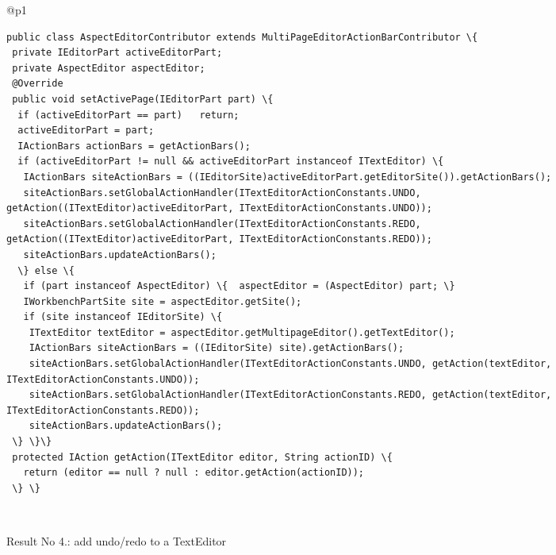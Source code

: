 \begin{figure*}[!htb]
 \begin{minipage}{1\textwidth}
\scriptsize 
\begin{tabular}{@{}p{}} 
 \hline 
   \\ \hline
  \vspace{-4mm}
\begin{Verbatim}[commandchars=\\\{\}, tabsize=2]
public class AspectEditorContributor extends MultiPageEditorActionBarContributor \{
 private IEditorPart activeEditorPart;
 private AspectEditor aspectEditor;
 @Override
 public void setActivePage(IEditorPart part) \{
  if (activeEditorPart == part)   return;
  activeEditorPart = part;
  IActionBars actionBars = getActionBars();
  if (activeEditorPart != null && activeEditorPart instanceof ITextEditor) \{
   IActionBars siteActionBars = ((IEditorSite)activeEditorPart.getEditorSite()).getActionBars();
   siteActionBars.setGlobalActionHandler(ITextEditorActionConstants.UNDO, getAction((ITextEditor)activeEditorPart, ITextEditorActionConstants.UNDO));
   siteActionBars.setGlobalActionHandler(ITextEditorActionConstants.REDO, getAction((ITextEditor)activeEditorPart, ITextEditorActionConstants.REDO));
   siteActionBars.updateActionBars();              
  \} else \{
   if (part instanceof AspectEditor) \{  aspectEditor = (AspectEditor) part; \}
   IWorkbenchPartSite site = aspectEditor.getSite();
   if (site instanceof IEditorSite) \{
    ITextEditor textEditor = aspectEditor.getMultipageEditor().getTextEditor();
    IActionBars siteActionBars = ((IEditorSite) site).getActionBars();
    siteActionBars.setGlobalActionHandler(ITextEditorActionConstants.UNDO, getAction(textEditor, ITextEditorActionConstants.UNDO));
    siteActionBars.setGlobalActionHandler(ITextEditorActionConstants.REDO, getAction(textEditor, ITextEditorActionConstants.REDO));
    siteActionBars.updateActionBars();              
 \} \}\}
 protected IAction getAction(ITextEditor editor, String actionID) \{
   return (editor == null ? null : editor.getAction(actionID));
 \} \}
   \end{Verbatim}
      \vspace{-4mm}
     \\ \hline
\end{tabular} 
\caption{Result No 4.: add undo/redo to a TextEditor}
\label{fig:undoEditor}
\end{minipage}
\end{figure*}




